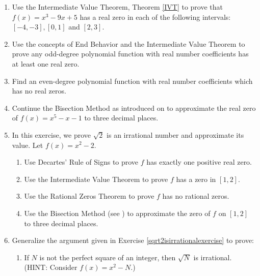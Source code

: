 \documentclass{ximera}
\begin{document}
\begin{enumerate}
\setcounter{enumi}{\value{HW}}

\item Use the Intermediate Value Theorem, Theorem \ref{IVT} to prove that $f(x) = x^{3} - 9x + 5$ has a real zero in each of the following intervals: $[-4, -3], [0, 1]$ and $[2, 3]$.

\item  Use the concepts of End Behavior and the Intermediate Value Theorem to prove any odd-degree polynomial function with real number coefficients has at least one real zero.

\item Find an even-degree polynomial function with real number coefficients which has no real zeros.

\item  \label{bisectionexercise} Continue  the Bisection Method as introduced on  \pageref{bisectionmethod} to approximate the real zero of $f(x) = x^5-x-1$ to three decimal places.

\item  \label{sqrt2isirrationalexercise} In this exercise, we prove $\sqrt{2}$ is an irrational number and approximate its value.  Let $f(x) = x^2-2$.

\begin{enumerate} 

\item Use Decartes' Rule of Signs to prove $f$ has exactly one positive real zero.

 \item Use the Intermediate Value Theorem to prove $f$ has a zero in $[1,2]$.

\item \label{sqrt2isirrationalexercise}  Use the Rational Zeros Theorem to prove $f$ has no rational zeros.

\item  Use the Bisection Method (see  \pageref{bisectionmethod}) to approximate the zero of $f$ on $[1,2]$ to three decimal places.

\end{enumerate}

\item  Generalize the argument given in Exercise \ref{sqrt2isirrationalexercise} to prove:

\begin{enumerate}

\item If $N$ is not the perfect square of an integer, then $\sqrt{N}$ is irrational. (HINT: Consider $f(x) = x^2-N$.)


\end{enumerate}
\end{enumerate}
\end{document}
